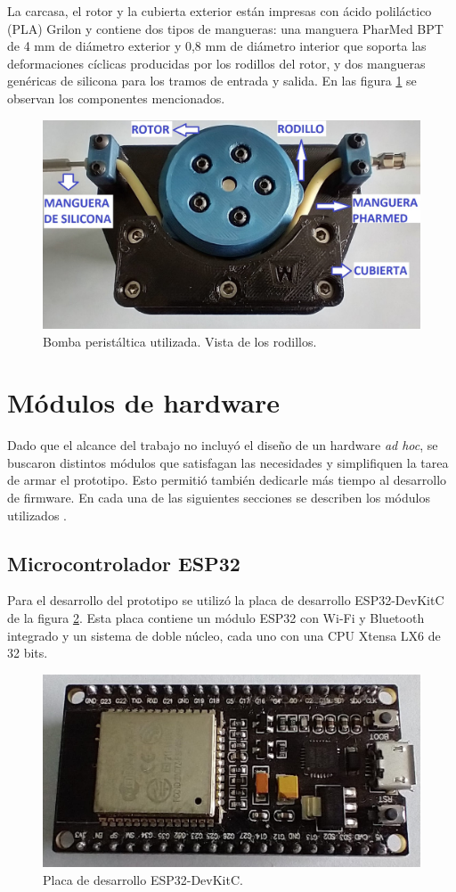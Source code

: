 La carcasa, el rotor y la cubierta exterior están impresas con ácido poliláctico (PLA) Grilon y contiene dos tipos de mangueras: una manguera PharMed BPT de 4 mm de diámetro exterior y 0,8 mm de diámetro interior que soporta las deformaciones cíclicas producidas por los rodillos del rotor, y dos mangueras genéricas de silicona para los tramos de entrada y salida. En las figura \ref{fig:bombaFrente} se observan los componentes mencionados.

\begin{figure}[htbp]
	\centering
	\includegraphics[width=.6\textwidth]{./Figures/bombaFrente.jpg}
	\caption{Bomba peristáltica utilizada. Vista de los rodillos.}
	\label{fig:bombaFrente}
\end{figure}

\section{Módulos de hardware}

Dado que el alcance del trabajo no incluyó el diseño de un hardware \textit{ad hoc}, se buscaron distintos módulos que satisfagan las necesidades y simplifiquen la tarea de armar el prototipo. Esto permitió también dedicarle más tiempo al desarrollo de firmware. En cada una de las siguientes secciones se describen los módulos utilizados \citep{WEBSITE:3}.

\subsection{Microcontrolador ESP32}

Para el desarrollo del prototipo se utilizó la placa de desarrollo ESP32-DevKitC de la figura \ref{fig:ESP32.jpeg}. Esta placa contiene un módulo ESP32 con Wi-Fi y Bluetooth integrado y un sistema de doble núcleo, cada uno con una CPU Xtensa LX6 de 32 bits.

\begin{figure}[htbp]
	\centering
	\includegraphics[width=.5\textwidth]{./Figures/ESP32.jpeg}
	\caption{Placa de desarrollo ESP32-DevKitC.}
	\label{fig:ESP32.jpeg}
\end{figure}

